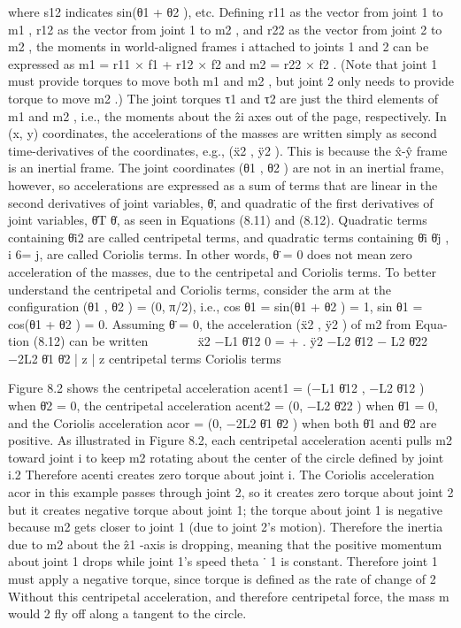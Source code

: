 \documentclass[12pt,a4paper]{article}
\begin{document}
where s12 indicates sin(θ1 + θ2 ), etc. Defining r11 as the vector from joint 1 to
m1 , r12 as the vector from joint 1 to m2 , and r22 as the vector from joint 2 to
m2 , the moments in world-aligned frames {i} attached to joints 1 and 2 can be
expressed as m1 = r11 × f1 + r12 × f2 and m2 = r22 × f2 . (Note that joint 1
must provide torques to move both m1 and m2 , but joint 2 only needs to provide
torque to move m2 .) The joint torques τ1 and τ2 are just the third elements of
m1 and m2 , i.e., the moments about the ẑi axes out of the page, respectively.
     In (x, y) coordinates, the accelerations of the masses are written simply as
second time-derivatives of the coordinates, e.g., (ẍ2 , ÿ2 ). This is because the
x̂-ŷ frame is an inertial frame. The joint coordinates (θ1 , θ2 ) are not in an
inertial frame, however, so accelerations are expressed as a sum of terms that
are linear in the second derivatives of joint variables, θ̈, and quadratic of the
first derivatives of joint variables, θ̇T θ̇, as seen in Equations (8.11) and (8.12).
Quadratic terms containing θ̇i2 are called centripetal terms, and quadratic
terms containing θ̇i θ̇j , i 6= j, are called Coriolis terms. In other words, θ̈ = 0
does not mean zero acceleration of the masses, due to the centripetal and Coriolis
terms.
     To better understand the centripetal and Coriolis terms, consider the arm
at the configuration (θ1 , θ2 ) = (0, π/2), i.e., cos θ1 = sin(θ1 + θ2 ) = 1, sin θ1 =
cos(θ1 + θ2 ) = 0. Assuming θ̈ = 0, the acceleration (ẍ2 , ÿ2 ) of m2 from Equa-
tion (8.12) can be written
                                                                 
                    ẍ2               −L1 θ̇12              0
                            =                         +                 .
                     ÿ2          −L2 θ̇12 − L2 θ̇22     −2L2 θ̇1 θ̇2
                               |          {z         } |    {z        }
                                      centripetal terms          Coriolis terms

Figure 8.2 shows the centripetal acceleration acent1 = (−L1 θ̇12 , −L2 θ̇12 ) when
θ̇2 = 0, the centripetal acceleration acent2 = (0, −L2 θ̇22 ) when θ̇1 = 0, and the
Coriolis acceleration acor = (0, −2L2 θ̇1 θ̇2 ) when both θ̇1 and θ̇2 are positive.
As illustrated in Figure 8.2, each centripetal acceleration acenti pulls m2 toward
joint i to keep m2 rotating about the center of the circle defined by joint i.2
Therefore acenti creates zero torque about joint i. The Coriolis acceleration acor
in this example passes through joint 2, so it creates zero torque about joint 2
but it creates negative torque about joint 1; the torque about joint 1 is negative
because m2 gets closer to joint 1 (due to joint 2’s motion). Therefore the inertia
due to m2 about the ẑ1 -axis is dropping, meaning that the positive momentum
about joint 1 drops while joint 1’s speed theta ˙ 1 is constant. Therefore joint 1
must apply a negative torque, since torque is defined as the rate of change of
    2 Without this centripetal acceleration, and therefore centripetal force, the mass m would
                                                                                        2
fly off along a tangent to the circle.
\end{document}
